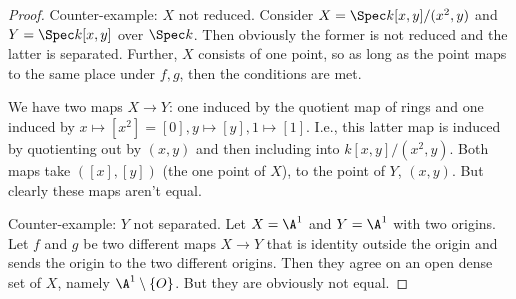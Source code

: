 \begin{proof}
	Counter-example: $X$ not reduced.
	Consider $X = \Spec k[x,y] / (x^2,y)$ and $Y = \Spec k[x,y]$ over $\Spec k $.
	Then obviously the former is not reduced and the latter is separated.
	Further, $X $ consists of one point, so as long as the point maps to the same place under $f,g $, then the conditions are met.

	We have two maps $X\to Y $: one induced by the quotient map of rings and one induced by $x\mapsto [x^2] = [0], y \mapsto [y] , 1\mapsto [1]$.
	I.e., this latter map is induced by quotienting out by $(x,y) $ and then including into $k[x,y] / (x^2,y) $.
	Both maps take $([x],[y]) $ (the one point of $X $), to the point of $Y $, $(x,y) $.
	But clearly these maps aren't equal.

	Counter-example: $Y $ not separated.
	Let $X = \A^1$ and $Y = \A^1 $ with two origins.
	Let $f $ and $g $ be two different maps $X\to Y $ that is identity outside the origin and sends the origin to the two different origins.
	Then they agree on an open dense set of $X $, namely $\A^1\setminus \{O\}   $.
	But they are obviously not equal.
\end{proof}

